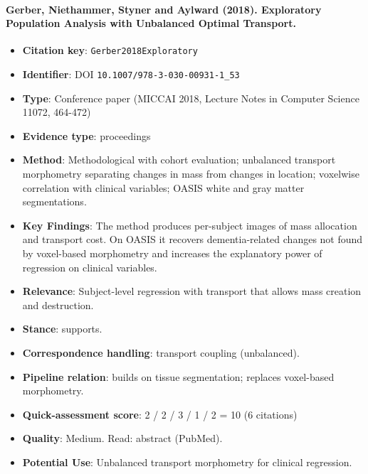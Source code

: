 \documentclass[journal,onecolumn]{IEEEtran}
\begin{document}
\paragraph{Gerber, Niethammer, Styner and Aylward (2018). Exploratory Population Analysis with Unbalanced Optimal Transport.~\cite{Gerber2018Exploratory}}\mbox{}

\begin{itemize}

\item{} \textbf{Citation key}: \texttt{Gerber2018Exploratory}

\item{} \textbf{Identifier}: DOI \nolinkurl{10.1007/978-3-030-00931-1_53}

\item{} \textbf{Type}: Conference paper (MICCAI 2018, Lecture Notes in Computer Science 11072, 464-472)

\item{} \textbf{Evidence type}: proceedings

\item{} \textbf{Method}: Methodological with cohort evaluation; unbalanced transport morphometry separating changes in mass from changes in location; voxelwise correlation with clinical variables; OASIS white and gray matter segmentations.

\item{} \textbf{Key Findings}: The method produces per-subject images of mass allocation and transport cost. On OASIS it recovers dementia-related changes not found by voxel-based morphometry and increases the explanatory power of regression on clinical variables.

\item{} \textbf{Relevance}: Subject-level regression with transport that allows mass creation and destruction.

\item{} \textbf{Stance}: supports.

\item{} \textbf{Correspondence handling}: transport coupling (unbalanced).

\item{} \textbf{Pipeline relation}: builds on tissue segmentation; replaces voxel-based morphometry.

\item{} \textbf{Quick-assessment score}: 2 / 2 / 3 / 1 / 2 = 10 (6 citations)

\item{} \textbf{Quality}: Medium. Read: abstract (PubMed).

\item{} \textbf{Potential Use}: Unbalanced transport morphometry for clinical regression.

\end{itemize}
\end{document}
